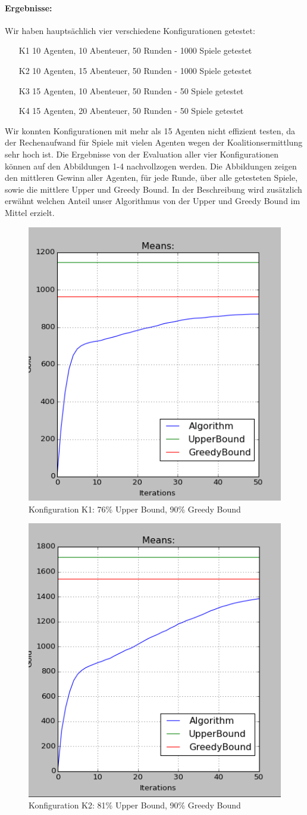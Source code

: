 \documentclass[fleqn,10pt]{SelfArx} %
\begin{document}
\paragraph{Ergebnisse:}
Wir haben hauptsächlich vier verschiedene Konfigurationen getestet:
\begin{itemize}
  \item[K1] 10 Agenten, 10 Abenteuer, 50 Runden - 1000 Spiele getestet
  \item[K2] 10 Agenten, 15 Abenteuer, 50 Runden - 1000 Spiele getestet
  \item[K3] 15 Agenten, 10 Abenteuer, 50 Runden - 50 Spiele getestet
  \item[K4] 15 Agenten, 20 Abenteuer, 50 Runden - 50 Spiele getestet
\end{itemize}
Wir konnten Konfigurationen mit mehr als 15 Agenten nicht effizient testen, da der Rechenaufwand für Spiele mit vielen Agenten wegen der Koalitionsermittlung sehr hoch ist. Die Ergebnisse von der Evaluation aller vier Konfigurationen können auf den Abbildungen 1-4 nachvollzogen werden. Die Abbildungen zeigen den mittleren Gewinn aller Agenten, für jede Runde, über alle getesteten Spiele, sowie die mittlere Upper und Greedy Bound. In der Beschreibung wird zusätzlich erwähnt welchen Anteil unser Algorithmus von der Upper und Greedy Bound im Mittel erzielt.
\begin{figure}
  \centering
  \includegraphics[width=.4\textwidth]{10ad_50r_1000it_cut.png}
  \caption{Konfiguration K1: 76\% Upper Bound, 90\% Greedy Bound}
\end{figure}
\label{fig:eval1}
\begin{figure}
  \centering
  \includegraphics[width=.4\textwidth]{15ad_50r_1000it_cut.png}
  \caption{Konfiguration K2: 81\% Upper Bound, 90\% Greedy Bound}
\end{figure}
\end{document}
